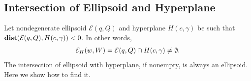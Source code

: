 \documentclass[letterpaper,10pt,english]{sphinxmanual}
\begin{document}
\subsection{Intersection of Ellipsoid and Hyperplane}
\label{chap_ellcalc:intersection-of-ellipsoid-and-hyperplane}
Let nondegenerate ellipsoid \({\mathcal E}(q,Q)\) and hyperplane
\(H(c,\gamma)\) be such that
\({\bf dist}({\mathcal E}(q,Q),H(c,\gamma))<0\). In other words,
\begin{gather}
\begin{split}{\mathcal E}_H(w,W) = {\mathcal E}(q,Q)\cap H(c,\gamma) \neq \emptyset .\end{split}\notag
\end{gather}
The intersection of ellipsoid with hyperplane, if nonempty, is always
an ellipsoid. Here we show how to find it.
\end{document}
